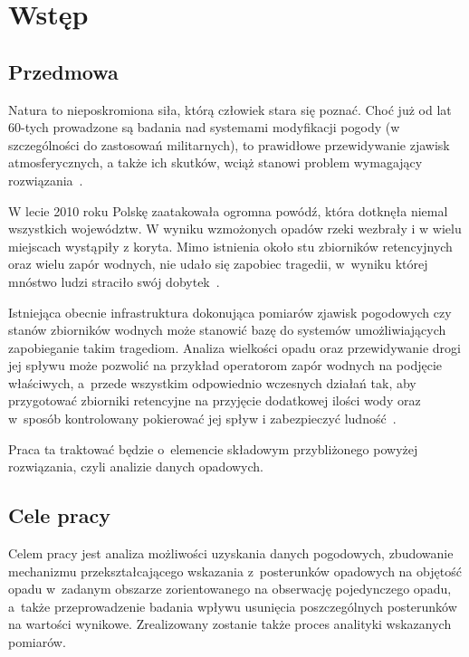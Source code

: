 \chapter{Wstęp}
\section{Przedmowa}
Natura to nieposkromiona siła, którą człowiek stara się poznać. Choć już od lat 60-tych prowadzone są badania nad systemami modyfikacji pogody (w szczególności do zastosowań militarnych), to prawidłowe przewidywanie zjawisk atmosferycznych, a także ich skutków, wciąż stanowi problem wymagający rozwiązania~\cite{systemy_kontroli_pogody}.

W lecie 2010 roku Polskę zaatakowała ogromna powódź, która dotknęła niemal wszystkich województw. W wyniku wzmożonych opadów rzeki wezbrały i w wielu miejscach wystąpiły z koryta. Mimo istnienia około stu zbiorników retencyjnych oraz wielu zapór wodnych, nie udało się zapobiec tragedii, w~wyniku której mnóstwo ludzi straciło swój dobytek~\cite{powodz}.

Istniejąca obecnie infrastruktura dokonująca pomiarów zjawisk pogodowych czy stanów zbiorników wodnych może stanowić bazę do systemów umożliwiających zapobieganie takim tragediom. Analiza wielkości opadu oraz przewidywanie drogi jej spływu może pozwolić na przykład operatorom zapór wodnych na podjęcie właściwych, a~przede wszystkim odpowiednio wczesnych działań tak, aby przygotować zbiorniki retencyjne na przyjęcie dodatkowej ilości wody oraz w~sposób kontrolowany pokierować jej spływ i zabezpieczyć ludność~\cite{imgw}.

Praca ta traktować będzie o~elemencie składowym przybliżonego powyżej rozwiązania, czyli analizie danych opadowych.

\section{Cele pracy}
\label{sec:cele}
Celem pracy jest analiza możliwości uzyskania danych pogodowych, zbudowanie mechanizmu przekształcającego wskazania z~posterunków opadowych na objętość opadu w~zadanym obszarze zorientowanego na obserwację pojedynczego opadu, a~także przeprowadzenie badania wpływu usunięcia poszczególnych posterunków na wartości wynikowe. Zrealizowany zostanie także proces analityki wskazanych pomiarów. 


